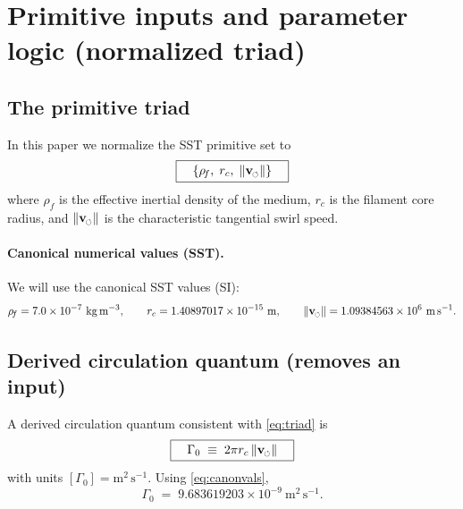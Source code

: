\documentclass[pdflatex,sn-mathphys-num]{revtex4-2}
\newcommand{\swirlarrow}{\mathchoice{\mkern-2mu\scriptstyle\boldsymbol{\circlearrowleft}}{\mkern-2mu\scriptstyle\boldsymbol{\circlearrowleft}}{\mkern-2mu\scriptscriptstyle\boldsymbol{\circlearrowleft}}{\mkern-2mu\scriptscriptstyle\boldsymbol{\circlearrowleft}}}
\newcommand{\rhoF}{\rho_{\!f}}   %
\newcommand{\vswirl}{\mathbf{v}_{\swirlarrow}}
\newcommand{\vnorm}{\lVert \vswirl \rVert}
\providecommand{\rc}{r_c}
\begin{document}
    \section{Primitive inputs and parameter logic (normalized triad)}

        \subsection{The primitive triad}
            In this paper we normalize the SST primitive set to
            \begin{equation}
                \boxed{\quad \{\rhoF,\;\rc,\;\vnorm\}\quad}
                \label{eq:triad}
            \end{equation}
            where \(\rhoF\) is the effective inertial density of the medium, \(\rc\) is the filament core radius,
            and \(\vnorm\) is the characteristic tangential swirl speed.

            \paragraph{Canonical numerical values (SST).}
                We will use the canonical SST values (SI):
                \begin{equation}
                    \rhoF = 7.0\times 10^{-7}\ \mathrm{kg\,m^{-3}},\qquad
                    \rc = 1.40897017\times 10^{-15}\ \mathrm{m},\qquad
                    \vnorm = 1.09384563\times 10^{6}\ \mathrm{m\,s^{-1}}.
                    \label{eq:canonvals}
                \end{equation}

    \subsection{Derived circulation quantum (removes an input)}
        A derived circulation quantum consistent with \eqref{eq:triad} is
        \begin{equation}
            \boxed{\quad \Gamma_0 \;\equiv\; 2\pi \rc \,\vnorm\quad}
            \label{eq:Gamma0}
        \end{equation}
        with units \([\Gamma_0]=\mathrm{m^2\,s^{-1}}\).
        Using \eqref{eq:canonvals},
        \begin{equation}
            \Gamma_0 \;=\; 9.683619203\times 10^{-9}\ \mathrm{m^2\,s^{-1}}.
            \label{eq:Gamma0num}
        \end{equation}
\end{document}
